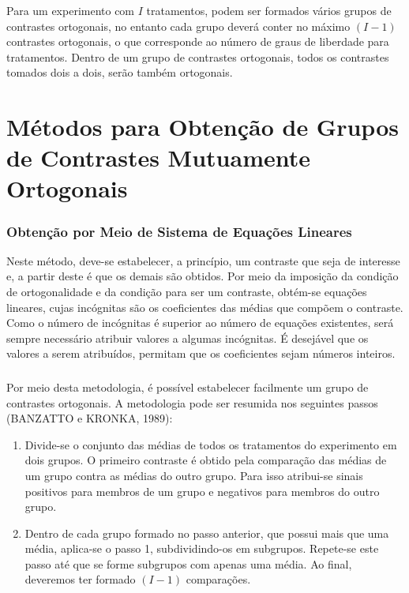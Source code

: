 \documentclass[14pt,aspectratio=1610]{beamer}
\begin{document}
\begin{frame}{}
\frametitle{}
\begin{block}{}
\justifying
Para um experimento com $I$ tratamentos, podem ser formados vários grupos de
contrastes ortogonais, no entanto cada grupo deverá conter no máximo $(I-1)$ contrastes
ortogonais, o que corresponde ao número de graus de liberdade para tratamentos.
Dentro de um grupo de contrastes ortogonais, todos os contrastes tomados dois a
dois, serão também ortogonais.
\end{block}
\end{frame}

\section{Métodos para Obtenção de Grupos de Contrastes Mutuamente Ortogonais}
\begin{frame}{}
\frametitle{Obtenção por Meio de Sistema de Equações Lineares}
\begin{block}{}
\justifying
Neste método, deve-se estabelecer, a princípio, um contraste que seja de interesse
e, a partir deste é que os demais são obtidos. Por meio da imposição da condição de
ortogonalidade e da condição para ser um contraste, obtém-se equações lineares, cujas
incógnitas são os coeficientes das médias que compõem o contraste. Como o número de
incógnitas é superior ao número de equações existentes, será sempre necessário atribuir
valores a algumas incógnitas. É desejável que os valores a serem atribuídos, permitam
que os coeficientes sejam números inteiros.
\end{block}
\end{frame}

\begin{frame}{}
\frametitle{}
\begin{block}{}
\justifying
Por meio desta metodologia, é possível estabelecer facilmente um grupo de
contrastes ortogonais. A metodologia pode ser resumida nos seguintes passos
(BANZATTO e KRONKA, 1989):
\begin{enumerate}
\item Divide-se o conjunto das médias de todos os tratamentos do experimento em dois
grupos. O primeiro contraste é obtido pela comparação das médias de um grupo contra
as médias do outro grupo. Para isso atribui-se sinais positivos para membros de um grupo e negativos para membros do outro grupo.\pause
\item Dentro de cada grupo formado no passo anterior, que possui mais que uma média,
aplica-se o passo 1, subdividindo-os em subgrupos. Repete-se este passo até que se
forme subgrupos com apenas uma média. Ao final, deveremos ter formado $(I-1)$
comparações.
\end{enumerate}
\end{block}
\end{frame}
\end{document}
